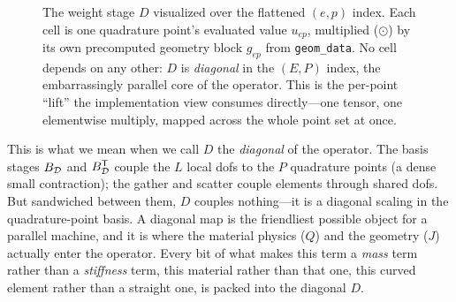 \begin{figure}[t]
\centering
{}
\caption[The quad-point weight as a parallel diagonal]{The weight stage
$D$ visualized over the flattened $(e,p)$ index. Each cell is one quadrature
point's evaluated value $u_{ep}$, multiplied ($\odot$) by its own precomputed
geometry block $g_{ep}$ from \texttt{geom\_data}. No cell depends on any other:
$D$ is \emph{diagonal} in the $(E,P)$ index, the embarrassingly parallel core of
the operator. This is the per-point ``lift'' the implementation view consumes
directly---one tensor, one elementwise multiply, mapped across the whole point
set at once.}
\label{fig:mf-diagonal}
\end{figure}

This is what we mean when we call $D$ the \emph{diagonal} of the operator. The
basis stages $B_{\mathcal{D}}$ and $B_{\mathcal{D}}^{\mathsf T}$ couple the $L$ local dofs
to the $P$ quadrature points (a dense small contraction); the gather and scatter
couple elements through shared dofs. But sandwiched between them, $D$ couples
nothing---it is a diagonal scaling in the quadrature-point basis. A diagonal map
is the friendliest possible object for a parallel machine, and it is where the
material physics ($Q$) and the geometry ($J$) actually enter the operator. Every
bit of what makes this term a \emph{mass} term rather than a \emph{stiffness}
term, this material rather than that one, this curved element rather than a
straight one, is packed into the diagonal $D$.


